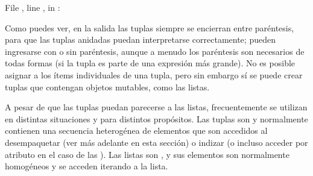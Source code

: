 \documentclass[a5paper,10pt,spanish]{sphinxmanual}
\begin{document}
\begin{sphinxVerbatim}[commandchars=\\\{\}]
    
\PYG{p}{[}\PYG{p}{]}
       
\PYG{p}{[}\PYG{p}{]}  
  File , line , in 
: 
  \PYG{p}{[}  \PYG{p}{]} \PYG{p}{[}  \PYG{p}{]}
\end{sphinxVerbatim}

\sphinxAtStartPar
Como puedes ver, en la salida las tuplas siempre se encierran entre paréntesis, para que las tuplas anidadas puedan interpretarse correctamente; pueden ingresarse con o sin paréntesis, aunque a menudo los paréntesis son necesarios de todas formas (si la tupla es parte de una expresión más grande).  No es posible asignar a los ítems individuales de una tupla, pero sin embargo sí se puede crear tuplas que contengan objetos mutables, como las listas.

\sphinxAtStartPar
A pesar de que las tuplas puedan parecerse a las listas, frecuentemente se utilizan en distintas situaciones y para distintos propósitos.  Las tuplas son {\hyperref[\detokenize{glossary:term-immutable}]{}} y normalmente contienen una secuencia heterogénea de elementos que son accedidos al desempaquetar (ver más adelante en esta sección) o indizar (o incluso acceder por atributo en el caso de las ).  Las listas son {\hyperref[\detokenize{glossary:term-mutable}]{}}, y sus elementos son normalmente homogéneos y se acceden iterando a la lista.
\end{document}
